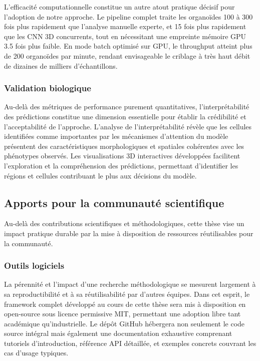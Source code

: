 L'efficacité computationnelle constitue un autre atout pratique décisif pour l'adoption de notre approche. Le pipeline complet traite les organoïdes 100 à 300 fois plus rapidement que l'analyse manuelle experte, et 15 fois plus rapidement que les CNN 3D concurrents, tout en nécessitant une empreinte mémoire GPU 3.5 fois plus faible. En mode batch optimisé sur GPU, le throughput atteint plus de 200 organoïdes par minute, rendant envisageable le criblage à très haut débit de dizaines de milliers d'échantillons.

\subsubsection{Validation biologique}

Au-delà des métriques de performance purement quantitatives, l'interprétabilité des prédictions constitue une dimension essentielle pour établir la crédibilité et l'acceptabilité de l'approche. L'analyse de l'interprétabilité révèle que les cellules identifiées comme importantes par les mécanismes d'attention du modèle présentent des caractéristiques morphologiques et spatiales cohérentes avec les phénotypes observés. Les visualisations 3D interactives développées facilitent l'exploration et la compréhension des prédictions, permettant d'identifier les régions et cellules contribuant le plus aux décisions du modèle.

\subsection{Apports pour la communauté scientifique}

Au-delà des contributions scientifiques et méthodologiques, cette thèse vise un impact pratique durable par la mise à disposition de ressources réutilisables pour la communauté.

\subsubsection{Outils logiciels}

La pérennité et l'impact d'une recherche méthodologique se mesurent largement à sa reproductibilité et à sa réutilisabilité par d'autres équipes. Dans cet esprit, le framework complet développé au cours de cette thèse sera mis à disposition en open-source sous licence permissive MIT, permettant une adoption libre tant académique qu'industrielle. Le dépôt GitHub hébergera non seulement le code source intégral mais également une documentation exhaustive comprenant tutoriels d'introduction, référence API détaillée, et exemples concrets couvrant les cas d'usage typiques. 

